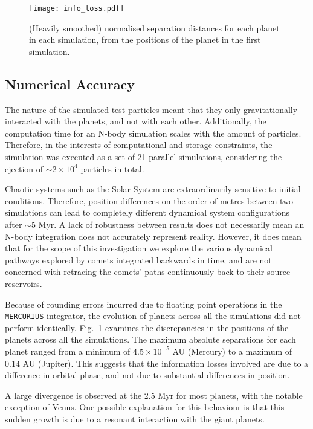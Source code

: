 \begin{figure}[t!]
    \centering
    \texttt{[image: info\_loss.pdf]}
    \caption[Parallel Simulations]{(Heavily smoothed) normalised separation distances for each planet in each simulation, from the positions of the planet in the first simulation.}
    \label{fig:info_loss}
\end{figure}

\clearpage
\subsection{Numerical Accuracy}
\label{sec:accuracy}

The nature of the simulated test particles meant that they only gravitationally interacted with the planets, and not with each other. Additionally, the computation time for an N-body simulation scales with the amount of particles. Therefore, in the interests of computational and storage constraints, the simulation was executed as a set of 21 parallel simulations, considering the ejection of $\sim2\times10^{4}$ particles in total.

Chaotic systems such as the Solar System are extraordinarily sensitive to initial conditions. Therefore, position differences on the order of metres between two simulations can lead to completely different dynamical system configurations after $\sim5$ Myr. A lack of robustness between results does not necessarily mean an N-body integration does not accurately represent reality. However, it does mean that for the scope of this investigation we explore the various dynamical pathways explored by comets integrated backwards in time, and are not concerned with retracing the comets' paths continuously back to their source reservoirs.

Because of rounding errors incurred due to floating point operations in the \texttt{MERCURIUS} integrator, the evolution of planets across all the simulations did not perform identically. Fig.~\ref{fig:info_loss} examines the discrepancies in the positions of the planets across all the simulations. The maximum absolute separations for each planet ranged from a minimum of $4.5\times10^{-5}$ AU (Mercury) to a maximum of 0.14 AU (Jupiter). This suggests that the information losses involved are due to a difference in orbital phase, and not due to substantial differences in position.

A large divergence is observed at the 2.5 Myr for most planets, with the notable exception of Venus. One possible explanation for this behaviour is that this sudden growth is due to a resonant interaction with the giant planets.

